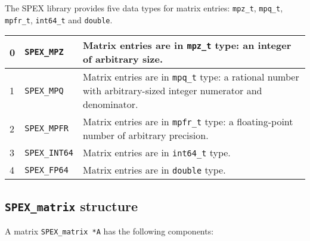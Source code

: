 \documentclass[12pt]{report}
\theoremstyle{definition}
\begin{document}
The SPEX library provides five data types for matrix entries: \verb|mpz_t|,
\verb|mpq_t|, \verb|mpfr_t|, \verb|int64_t| and \verb|double|.

{\small
\begin{center}
\begin{tabular}{llp{4in}}
\hline
0 & \verb|SPEX_MPZ|     & Matrix entries are in \verb|mpz_t| type: an integer
                          of arbitrary size. \\
\hline
1 & \verb|SPEX_MPQ|     & Matrix entries are in \verb|mpq_t| type: a rational
                          number with arbitrary-sized integer numerator and
                          denominator. \\
\hline
2 & \verb|SPEX_MPFR|    & Matrix entries are in \verb|mpfr_t| type: a
                          floating-point number of arbitrary precision. \\
\hline
3 & \verb|SPEX_INT64|   & Matrix entries are in \verb|int64_t| type. \\
\hline
4 & \verb|SPEX_FP64|    & Matrix entries are in \verb|double| type. \\
\hline
\end{tabular}
\label{tab:SPEX_type}
\end{center}
}

\subsection{\texttt{SPEX\_matrix} structure}

A matrix \verb|SPEX_matrix *A| has the following components:
\end{document}
